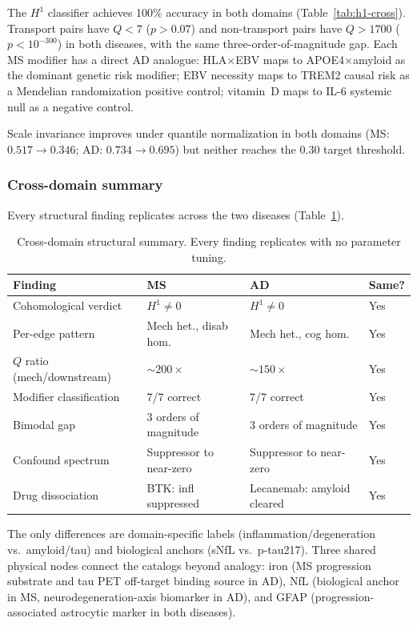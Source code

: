 \documentclass[11pt]{article}
\begin{document}
The $H^1$ classifier achieves 100\% accuracy in both domains (Table~\ref{tab:h1-cross}).
Transport pairs have $Q < 7$ ($p > 0.07$) and non-transport pairs have $Q > 1700$ ($p < 10^{-300}$) in both diseases, with the same three-order-of-magnitude gap.
Each MS modifier has a direct AD analogue: HLA$\times$EBV maps to APOE4$\times$amyloid as the dominant genetic risk modifier; EBV necessity maps to TREM2 causal risk as a Mendelian randomization positive control; vitamin~D maps to IL-6 systemic null as a negative control.

Scale invariance improves under quantile normalization in both domains (MS: $0.517 \to 0.346$; AD: $0.734 \to 0.695$) but neither reaches the $0.30$ target threshold.

\subsubsection{Cross-domain summary}

Every structural finding replicates across the two diseases (Table~\ref{tab:cross-summary}).

\begin{table}[t]
\centering
\caption{Cross-domain structural summary. Every finding replicates with no parameter tuning.}
\label{tab:cross-summary}
\small
\begin{tabular}{@{}llll@{}}
\toprule
\textbf{Finding} & \textbf{MS} & \textbf{AD} & \textbf{Same?} \\
\midrule
Cohomological verdict & $H^1 \neq 0$ & $H^1 \neq 0$ & Yes \\
Per-edge pattern & Mech het., disab hom. & Mech het., cog hom. & Yes \\
$Q$ ratio (mech/downstream) & $\sim\!200\times$ & $\sim\!150\times$ & Yes \\
Modifier classification & 7/7 correct & 7/7 correct & Yes \\
Bimodal gap & 3 orders of magnitude & 3 orders of magnitude & Yes \\
Confound spectrum & Suppressor to near-zero & Suppressor to near-zero & Yes \\
Drug dissociation & BTK: infl suppressed & Lecanemab: amyloid cleared & Yes \\
\bottomrule
\end{tabular}
\end{table}

The only differences are domain-specific labels (inflammation/degeneration vs.\ amyloid/tau) and biological anchors (sNfL vs.\ p-tau217).
Three shared physical nodes connect the catalogs beyond analogy: iron (MS progression substrate and tau PET off-target binding source in AD), NfL (biological anchor in MS, neurodegeneration-axis biomarker in AD), and GFAP (progression-associated astrocytic marker in both diseases).
\end{document}
